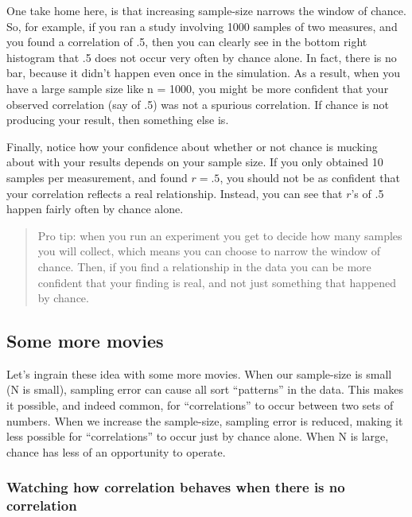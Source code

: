 \documentclass[]{book}
\begin{document}
One take home here, is that increasing sample-size narrows the window of chance. So, for example, if you ran a study involving 1000 samples of two measures, and you found a correlation of .5, then you can clearly see in the bottom right histogram that .5 does not occur very often by chance alone. In fact, there is no bar, because it didn't happen even once in the simulation. As a result, when you have a large sample size like n = 1000, you might be more confident that your observed correlation (say of .5) was not a spurious correlation. If chance is not producing your result, then something else is.

Finally, notice how your confidence about whether or not chance is mucking about with your results depends on your sample size. If you only obtained 10 samples per measurement, and found \(r = .5\), you should not be as confident that your correlation reflects a real relationship. Instead, you can see that \(r\)'s of .5 happen fairly often by chance alone.

\begin{quote}
Pro tip: when you run an experiment you get to decide how many samples you will collect, which means you can choose to narrow the window of chance. Then, if you find a relationship in the data you can be more confident that your finding is real, and not just something that happened by chance.
\end{quote}

\hypertarget{some-more-movies}{%
\subsection{Some more movies}\label{some-more-movies}}

Let's ingrain these idea with some more movies. When our sample-size is small (N is small), sampling error can cause all sort ``patterns'' in the data. This makes it possible, and indeed common, for ``correlations'' to occur between two sets of numbers. When we increase the sample-size, sampling error is reduced, making it less possible for ``correlations'' to occur just by chance alone. When N is large, chance has less of an opportunity to operate.

\hypertarget{watching-how-correlation-behaves-when-there-is-no-correlation}{%
\subsubsection{Watching how correlation behaves when there is no correlation}\label{watching-how-correlation-behaves-when-there-is-no-correlation}}
\end{document}
